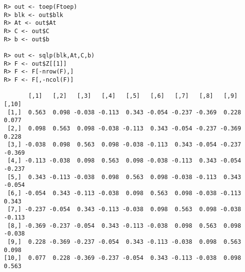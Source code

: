 \documentclass{article}
\begin{document}
\begin{verbatim}
R> out <- toep(Ftoep)
R> blk <- out$blk
R> At <- out$At
R> C <- out$C
R> b <- out$b

R> out <- sqlp(blk,At,C,b)
R> F <- out$Z[[1]]
R> F <- F[-nrow(F),]
R> F <- F[,-ncol(F)]

       [,1]   [,2]   [,3]   [,4]   [,5]   [,6]   [,7]   [,8]   [,9]  [,10]
 [1,]  0.563  0.098 -0.038 -0.113  0.343 -0.054 -0.237 -0.369  0.228  0.077
 [2,]  0.098  0.563  0.098 -0.038 -0.113  0.343 -0.054 -0.237 -0.369  0.228
 [3,] -0.038  0.098  0.563  0.098 -0.038 -0.113  0.343 -0.054 -0.237 -0.369
 [4,] -0.113 -0.038  0.098  0.563  0.098 -0.038 -0.113  0.343 -0.054 -0.237
 [5,]  0.343 -0.113 -0.038  0.098  0.563  0.098 -0.038 -0.113  0.343 -0.054
 [6,] -0.054  0.343 -0.113 -0.038  0.098  0.563  0.098 -0.038 -0.113  0.343
 [7,] -0.237 -0.054  0.343 -0.113 -0.038  0.098  0.563  0.098 -0.038 -0.113
 [8,] -0.369 -0.237 -0.054  0.343 -0.113 -0.038  0.098  0.563  0.098 -0.038
 [9,]  0.228 -0.369 -0.237 -0.054  0.343 -0.113 -0.038  0.098  0.563  0.098
[10,]  0.077  0.228 -0.369 -0.237 -0.054  0.343 -0.113 -0.038  0.098  0.563
\end{verbatim}
\end{document}
